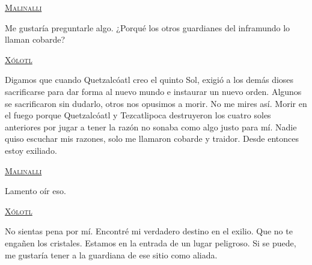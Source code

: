 \documentclass[11pt,letterpaper]{article}
\begin{document}
\begin{center}
\textsc{\underline{Malinalli}}
\\
\par
Me gustaría preguntarle algo. ¿Porqué los otros guardianes del inframundo lo llaman cobarde?
\\
\par
\textsc{\underline{Xólotl}}
\\
\par
Digamos que cuando Quetzalcóatl creo el quinto Sol, exigió a los demás dioses sacrificarse para dar forma al nuevo mundo e instaurar un nuevo orden. Algunos se sacrificaron sin dudarlo, otros nos opusimos a morir. No me mires así. Morir en el fuego porque Quetzalcóatl y Tezcatlipoca destruyeron los cuatro soles anteriores por jugar a tener la razón no sonaba como algo justo para mí. Nadie quiso escuchar mis razones, solo me llamaron cobarde y traidor. Desde entonces estoy exiliado.
\\
\par
\textsc{\underline{Malinalli}}
\\
\par
Lamento oír eso.
\\
\par
\textsc{\underline{Xólotl}}
\\
\par
No sientas pena por mí. Encontré mi verdadero destino en el exilio. Que no te engañen los cristales. Estamos en la entrada de un lugar peligroso. Si se puede, me gustaría tener a la guardiana de ese sitio como aliada. 
\end{center}
\end{document}
